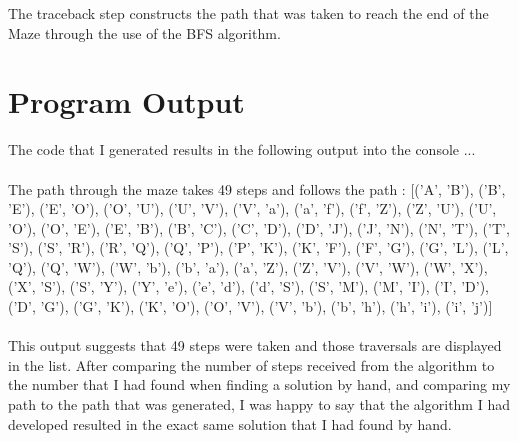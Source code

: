 \documentclass[12pt]{article}
\newcommand\tab[1][.5in]{\hspace*{#1}}
\begin{document}
\tab The traceback step constructs the path that was taken to reach the end of the Maze through the use of the BFS algorithm.

\section{Program Output}
The code that I generated results in the following output into the console ... \\\\
The path through the maze takes 49 steps and follows the path : 
[('A', 'B'), ('B', 'E'), ('E', 'O'), ('O', 'U'), ('U', 'V'), ('V', 'a'), ('a', 'f'), ('f', 'Z'), ('Z', 'U'), ('U', 'O'), ('O', 'E'), ('E', 'B'), ('B', 'C'), ('C', 'D'), ('D', 'J'), ('J', 'N'), ('N', 'T'), ('T', 'S'), ('S', 'R'), ('R', 'Q'), ('Q', 'P'), ('P', 'K'), ('K', 'F'), ('F', 'G'), ('G', 'L'), ('L', 'Q'), ('Q', 'W'), ('W', 'b'), ('b', 'a'), ('a', 'Z'), ('Z', 'V'), ('V', 'W'), ('W', 'X'), ('X', 'S'), ('S', 'Y'), ('Y', 'e'), ('e', 'd'), ('d', 'S'), ('S', 'M'), ('M', 'I'), ('I', 'D'), ('D', 'G'), ('G', 'K'), ('K', 'O'), ('O', 'V'), ('V', 'b'), ('b', 'h'), ('h', 'i'), ('i', 'j')] \\~\\

This output suggests that 49 steps were taken and those traversals are displayed in the list. After comparing the number of steps received from the algorithm to the number that I had found when finding a solution by hand, and comparing my path to the path that was generated, I was happy to say that the algorithm I had developed resulted in the exact same solution that I had found by hand.
\end{document}
